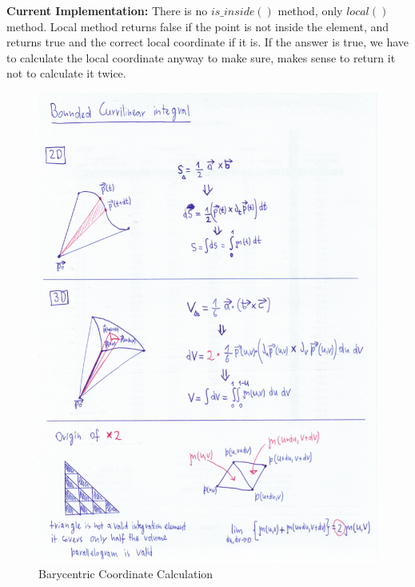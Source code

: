 \noindent
\textbf{Current Implementation: } There is no $is\_inside()$ method, only $local()$ method. Local method returns false if the point is not inside the element, and returns true and the correct local coordinate if it is. If the answer is true, we have to calculate the local coordinate anyway to make sure, makes sense to return it not to calculate it twice.

\begin{figure}[p]
    \centering
    \includegraphics[scale=0.7]{doc-pics/pic-bounded-curvilinear-integral.png}
    \caption{Barycentric Coordinate Calculation}
    \label{fig:barycentric_coordinate_calculation}
\end{figure}